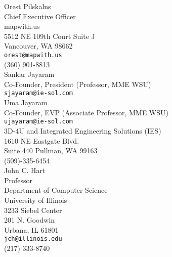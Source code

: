 \documentclass[10pt]{article}
\begin{document}
\pagebreak

Orest Pilskalns\\
Chief Executive Officer\\
mapwith.us\\
5512 NE 109th Court Suite J\\
Vancouver, WA 98662 \\
{\tt orest@mapwith.us} \\
(360) 901-8813\\

Sankar Jayaram\\  
Co-Founder, President (Professor, MME WSU)\\
{\tt sjayaram@ie-sol.com} \\
Uma Jayaram \\
Co-Founder, EVP (Associate Professor, MME WSU)\\
{\tt ujayaram@ie-sol.com} \\
3D-4U and Integrated Engineering Solutions (IES) \\
1610 NE Eastgate Blvd. \\
Suite 440 Pullman, WA 99163\\
(509)-335-6454\\

 
John C. Hart\\
Professor\\
Department of Computer Science\\
University of Illinois\\
3233 Siebel Center \\
201 N. Goodwin \\
Urbana, IL 61801 \\
{\tt jch@illinois.edu} \\
(217) 333-8740 \\


\end{document}
